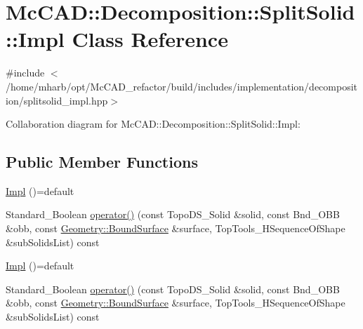\hypertarget{classMcCAD_1_1Decomposition_1_1SplitSolid_1_1Impl}{}\section{Mc\+C\+AD\+:\+:Decomposition\+:\+:Split\+Solid\+:\+:Impl Class Reference}
\label{classMcCAD_1_1Decomposition_1_1SplitSolid_1_1Impl}


{\ttfamily \#include $<$/home/mharb/opt/\+Mc\+C\+A\+D\+\_\+refactor/build/includes/implementation/decomposition/splitsolid\+\_\+impl.\+hpp$>$}



Collaboration diagram for Mc\+C\+AD\+:\+:Decomposition\+:\+:Split\+Solid\+:\+:Impl\+:
\subsection*{Public Member Functions}
\begin{DoxyCompactItemize}
\item 
\hyperlink{classMcCAD_1_1Decomposition_1_1SplitSolid_1_1Impl_a55f695ba13a95cfee799bf2c7d091602}{Impl} ()=default
\item 
Standard\+\_\+\+Boolean \hyperlink{classMcCAD_1_1Decomposition_1_1SplitSolid_1_1Impl_ab28ed049d20e8170ce91740b1fc89fe3}{operator()} (const Topo\+D\+S\+\_\+\+Solid \&solid, const Bnd\+\_\+\+O\+BB \&obb, const \hyperlink{classMcCAD_1_1Geometry_1_1BoundSurface}{Geometry\+::\+Bound\+Surface} \&surface, Top\+Tools\+\_\+\+H\+Sequence\+Of\+Shape \&sub\+Solids\+List) const
\item 
\hyperlink{classMcCAD_1_1Decomposition_1_1SplitSolid_1_1Impl_a55f695ba13a95cfee799bf2c7d091602}{Impl} ()=default
\item 
Standard\+\_\+\+Boolean \hyperlink{classMcCAD_1_1Decomposition_1_1SplitSolid_1_1Impl_ab28ed049d20e8170ce91740b1fc89fe3}{operator()} (const Topo\+D\+S\+\_\+\+Solid \&solid, const Bnd\+\_\+\+O\+BB \&obb, const \hyperlink{classMcCAD_1_1Geometry_1_1BoundSurface}{Geometry\+::\+Bound\+Surface} \&surface, Top\+Tools\+\_\+\+H\+Sequence\+Of\+Shape \&sub\+Solids\+List) const
\end{DoxyCompactItemize}
